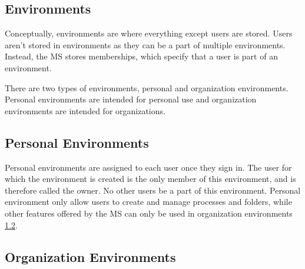 \begin{itemize}






\section{Environments}
\label{cha:conceptanddesign:environments}

Conceptually, environments are where everything except users are stored.
Users aren't stored in environments as they can be a part of multiple environments.
Instead, the MS stores memberships, which specify that a user is part of an environment.

There are two types of environments, personal and organization environments.
Personal environments are intended for personal use and organization environments are intended
for organizations.

\subsection{Personal Environments}
\label{cha:conceptanddesign:environments:personal}

Personal environments are assigned to each user once they sign in. 
The user for which the environment is created is the only member of this
environment, and is therefore called the owner.
No other users be a part of this environment.
Personal environment only allow users to create and manage processes and folders,
while other features offered by the MS can only be used in organization environments
\ref{cha:conceptanddesign:environments:organization}.

\subsection{Organization Environments}
\label{cha:conceptanddesign:environments:organization}


\end{itemize}
